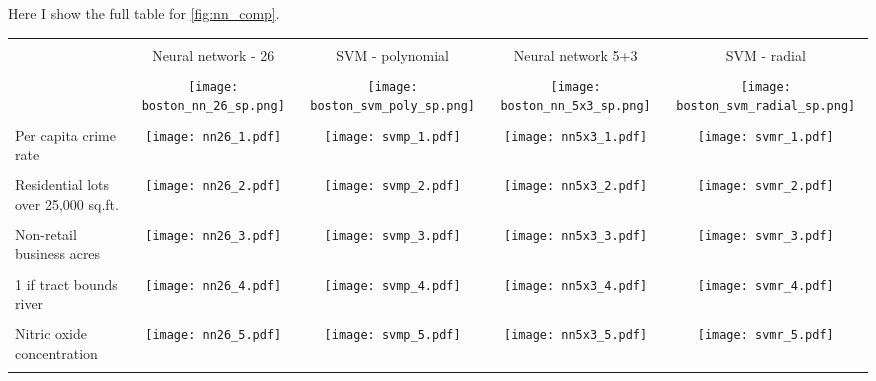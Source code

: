 
Here I show the full table for \autoref{fig:nn_comp}.

\begin{tiny}
\begin{longtable}{p{2.5cm}||cccc}
  \hline \\
  & Neural network - 26 & SVM - polynomial & Neural network 5+3 & SVM - radial \\
  \hline \\ \endhead
  &
    \texttt{[image: boston\_nn\_26\_sp.png]}
  &
    \texttt{[image: boston\_svm\_poly\_sp.png]}
  &
    \texttt{[image: boston\_nn\_5x3\_sp.png]}
  &
    \texttt{[image: boston\_svm\_radial\_sp.png]}
  \\
  \hline \\
  Per capita crime rate &
    \texttt{[image: nn26\_1.pdf]}
  &
    \texttt{[image: svmp\_1.pdf]}
  &
    \texttt{[image: nn5x3\_1.pdf]}
  &
    \texttt{[image: svmr\_1.pdf]}
  \\
  \hline \\
  Residential lots over 25,000 sq.ft. &
    \texttt{[image: nn26\_2.pdf]}
  &
    \texttt{[image: svmp\_2.pdf]}
  &
    \texttt{[image: nn5x3\_2.pdf]}
  &
    \texttt{[image: svmr\_2.pdf]}
  \\
  \hline \\
  Non-retail business acres &
    \texttt{[image: nn26\_3.pdf]}
  &
    \texttt{[image: svmp\_3.pdf]}
  &
    \texttt{[image: nn5x3\_3.pdf]}
  &
    \texttt{[image: svmr\_3.pdf]}
  \\
  \hline \\
  1 if tract bounds river &
    \texttt{[image: nn26\_4.pdf]}
  &
    \texttt{[image: svmp\_4.pdf]}
  &
    \texttt{[image: nn5x3\_4.pdf]}
  &
    \texttt{[image: svmr\_4.pdf]}
  \\
  \hline \\
  Nitric oxide concentration &
    \texttt{[image: nn26\_5.pdf]}
  &
    \texttt{[image: svmp\_5.pdf]}
  &
    \texttt{[image: nn5x3\_5.pdf]}
  &
    \texttt{[image: svmr\_5.pdf]}
  \\
  \hline \\

\end{longtable}
\end{tiny}
